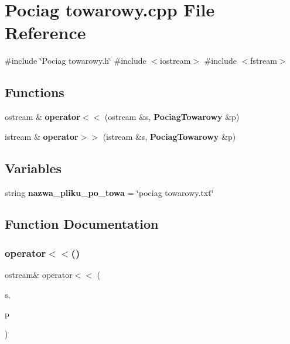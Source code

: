 \section{Pociag towarowy.\+cpp File Reference}
\label{_pociag_01towarowy_8cpp}
{\ttfamily \#include \char`\"{}Pociag towarowy.\+h\char`\"{}}\newline
{\ttfamily \#include $<$iostream$>$}\newline
{\ttfamily \#include $<$fstream$>$}\newline
\subsection*{Functions}
\begin{DoxyCompactItemize}
\item 
ostream \& \textbf{ operator$<$$<$} (ostream \&s, \textbf{ Pociag\+Towarowy} \&p)
\item 
istream \& \textbf{ operator$>$$>$} (istream \&s, \textbf{ Pociag\+Towarowy} \&p)
\end{DoxyCompactItemize}
\subsection*{Variables}
\begin{DoxyCompactItemize}
\item 
string \textbf{ nazwa\+\_\+pliku\+\_\+po\+\_\+towa} = \char`\"{}pociag towarowy.\+txt\char`\"{}
\end{DoxyCompactItemize}


\subsection{Function Documentation}
\mbox{\label{_pociag_01towarowy_8cpp_a46791b0f101793f7313aafa2eade03de}} 
\subsubsection{operator$<$$<$()}
{\footnotesize\ttfamily ostream\& operator$<$$<$ (\begin{DoxyParamCaption}\item[{ostream \&}]{s,  }\item[{\textbf{ Pociag\+Towarowy} \&}]{p }\end{DoxyParamCaption})}

